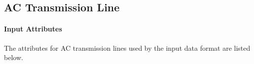 \documentclass{article}
\begin{document}


\subsection{AC Transmission Line}
\label{nom:line}
\paragraph{Input Attributes}
The attributes for AC transmission lines used by the input data format are listed below.
\end{document}
